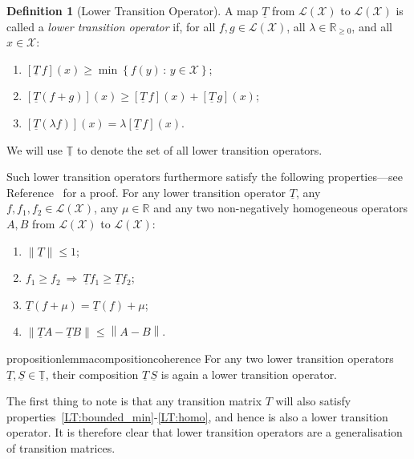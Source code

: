 \documentclass[10pt,a4paper]{paper}
\theoremstyle{definition}
\newtheorem{definition}{Definition}
\newcommand{\reals}{\mathbb{R}}
\newcommand{\realsnonneg}{\reals_{\geq 0}}
\newcommand{\states}{\mathcal{X}}
\newcommand{\lt}{\underline{T}}
\newcommand{\gambles}{\mathcal{L}}
\newcommand{\gamblesX}{\gambles(\states)}
\newcommand{\then}{\Rightarrow}
\newcommand{\norm}[1]{\left\lVert #1 \right\rVert}
\begin{document}
\begin{definition}[Lower Transition Operator]\label{def:coh_low_trans}
A map $\lt$ from $\gamblesX$ to $\gamblesX$ is called a \emph{lower transition operator} if, for all $f,g\in\gamblesX$, all $\lambda\in\realsnonneg$, and all $x\in\states$:
\begin{enumerate}[label=LT\arabic*:,ref=LT\arabic*]
\item
$\left[\lt\,f\right](x)\geq\min\left\{f(y)\,\colon\,y\in\states\right\}$; \label{LT:bounded_min}
\item
$\left[\lt(f+g)\right](x)\geq \left[\lt\,f\right](x)+\left[\lt\,g\right](x)$; \label{LT:super_additive}
\item
$\left[\lt(\lambda f)\right](x)=\lambda\left[\lt\,f\right](x)$. \label{LT:homo}
\end{enumerate}
\noindent We will use $\underline{\mathbb{T}}$ to denote the set of all lower transition operators.


Such lower transition operators furthermore satisfy the following properties---see Reference~\cite{DeBock:2016} for a proof. For any lower transition operator $\lt$, any $f,f_1,f_2\in\gamblesX$, any $\mu\in\reals$ and any two non-negatively homogeneous operators $A,B$ from $\gamblesX$ to $\gamblesX$:
\begin{enumerate}[label=LT\arabic*:,ref=LT\arabic*,start=4]
\item
$\norm{\lt} \leq 1$; \label{LT:norm_at_most_one}
\item
$f_1\geq f_2~\then~\lt f_1\geq\lt f_2$;\label{LT:monotonicity}
\item
$\lt(f+\mu)=\lt(f)+\mu$;\label{LT:constantadditivity}
\item
$\norm{\lt A - \lt B} \leq \norm{A - B}$. \label{LT:differencenorm}
\end{enumerate}
\vspace{0pt}
\end{definition}

\begin{restatable}{proposition}{lemmacompositioncoherence}
\label{lemma:compositioncoherence}
For any two lower transition operators $\lt,\underline{S}\in\underline{\mathbb{T}}$, their composition $\lt\,\underline{S}$ is again a lower transition operator.%
\end{restatable}

The first thing to note is that any transition matrix $T$ will also satisfy properties~\ref{LT:bounded_min}-\ref{LT:homo}, and hence is also a lower transition operator. It is therefore clear that lower transition operators are a generalisation of transition matrices.
\end{document}
